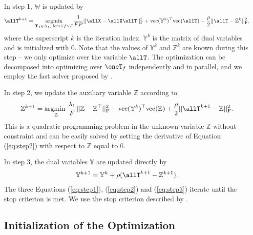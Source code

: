 In step 1, $\mathbb{W}$ is updated by
\begin{equation}
\allT^{k+1}= \underset{\mathbf{T}_f \in{\Delta_f} \text{, for} 1\leq f\leq F}{\text{argmin}} \frac{1}{FP} ||\allX - \allX\allT||_\text{F}^2 + \text{vec}(\mathbb{Y}^k)^\top \text{vec} (\allT) + \frac{\rho}{2} ||\allT-\mathbb{Z}^k||_\text{F}^2,
\label{eq:step1}
\end{equation}
where the superscript $k$ is the iteration index. $\mathbb{Y}^k$ is the matrix of  dual variables and is initialized with 0. Note that the values of $\mathbb{Y}^{k}$ and $\mathbb{Z}^{k}$ are known during this step -- we only optimize over the variable $\allT$. The optimization can be decomposed into optimizing over $\oneT_f$ independently and in parallel, and we employ the fast solver proposed by \citet{chen:hal-00995911}. 

In step 2, we update the auxiliary variable $\mathbb{Z}$ according to
\begin{equation}
\mathbb{Z}^{k+1} = \underset{\mathbb{Z}}{\text{argmin }} \frac{\lambda_1}{F}||\mathbb{Z} - \mathbb{Z}^\top ||_\text{F}^2 - \text{vec}(\mathbb{Y}^k)^\top \text{vec}(\mathbb{Z}) + \frac{\rho}{2}||\allT^{k+1}-\mathbb{Z}||_\text{F}^2.
\label{eq:step2}
\end{equation}
This is a quadratic programming problem in the unknown variable $\mathbb{Z}$ without constraint and can be easily solved by setting the derivative of Equation (\ref{eq:step2}) with respect to $\mathbb{Z}$ equal to 0. 

In step 3, the dual variables $\mathbb{Y}$ are updated directly by
\begin{equation}
\mathbb{Y}^{k+1} = \mathbb{Y}^k + \rho(\allT^{k+1} - \mathbb{Z}^{k+1}).
\label{eq:step3}
\end{equation}
The three Equations (\ref{eq:step1}), (\ref{eq:step2}) and (\ref{eq:step3}) iterate until the stop criterion is met. We use the stop criterion described by \citet{boyd2011distributed}.

\subsection{Initialization of the Optimization}

